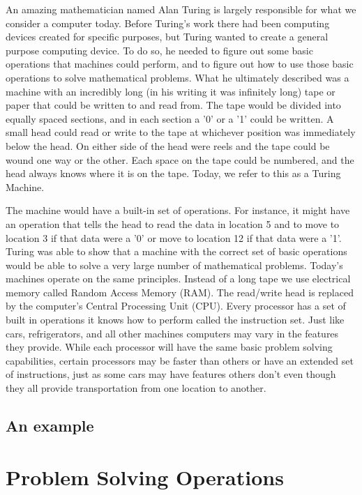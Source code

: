 \documentclass[11pt,fleqn]{book} %
\begin{document}
An amazing mathematician named Alan Turing is largely responsible for what we consider a computer today.  Before Turing's work there had been computing devices created for specific purposes, but Turing wanted to create a general purpose computing device.  To do so, he needed to figure out some basic operations that machines could perform, and to figure out how to use those basic operations to solve mathematical problems.  What he ultimately described was a machine with an incredibly long (in his writing it was infinitely long) tape or paper that could be written to and read from.  The tape would be divided into equally spaced sections, and in each section a '0' or a '1' could be written.  A small head could read or write to the tape at whichever position was immediately below the head.  On either side of the head were reels and the tape could be wound one way or the other.  Each space on the tape could be numbered, and the head always knows where it is on the tape.  Today, we refer to this as a \gls{Turing Machine}.

The machine would have a built-in set of operations.  For instance, it might have an operation that tells the head to read the data in location 5 and to move to location 3 if that data were a '0' or move to location 12 if that data were a '1'.  Turing was able to show that a machine with the correct set of basic operations would be able to solve a very large number of mathematical problems.  Today's machines operate on the same principles.  Instead of a long tape we use electrical memory called Random Access Memory (RAM).  The read/write head is replaced by the computer's Central Processing Unit (CPU).  Every processor has a set of built in operations it knows how to perform called the \gls{instruction set}.  Just like cars, refrigerators, and all other machines computers may vary in the features they provide.  While each processor will have the same basic problem solving capabilities, certain processors may be faster than others or have an extended set of instructions, just as some cars may have features others don't even though they all provide transportation from one location to another. 

\section{An example}

\chapter{Problem Solving Operations}
\end{document}
